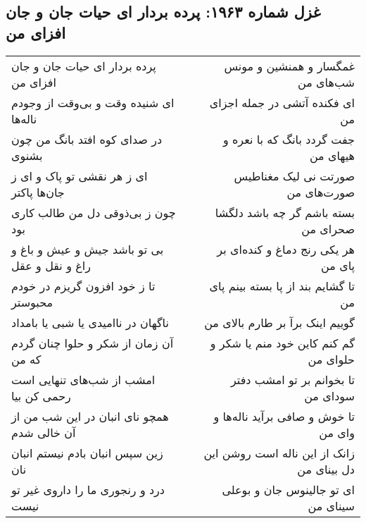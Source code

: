 \begin{center}
\section*{غزل شماره ۱۹۶۳: پرده بردار ای حیات جان و جان افزای من}
\label{sec:1963}
\begin{longtable}{l p{0.5cm} r}
پرده بردار ای حیات جان و جان افزای من
&&
غمگسار و همنشین و مونس شب‌های من
\\
ای شنیده وقت و بی‌وقت از وجودم ناله‌ها
&&
ای فکنده آتشی در جمله اجزای من
\\
در صدای کوه افتد بانگ من چون بشنوی
&&
جفت گردد بانگ که با نعره و هیهای من
\\
ای ز هر نقشی تو پاک و ای ز جان‌ها پاکتر
&&
صورتت نی لیک مغناطیس صورت‌های من
\\
چون ز بی‌ذوقی دل من طالب کاری بود
&&
بسته باشم گر چه باشد دلگشا صحرای من
\\
بی تو باشد جیش و عیش و باغ و راغ و نقل و عقل
&&
هر یکی رنج دماغ و کنده‌ای بر پای من
\\
تا ز خود افزون گریزم در خودم محبوستر
&&
تا گشایم بند از پا بسته بینم پای من
\\
ناگهان در ناامیدی یا شبی یا بامداد
&&
گوییم اینک برآ بر طارم بالای من
\\
آن زمان از شکر و حلوا چنان گردم که من
&&
گم کنم کاین خود منم یا شکر و حلوای من
\\
امشب از شب‌های تنهایی است رحمی کن بیا
&&
تا بخوانم بر تو امشب دفتر سودای من
\\
همچو نای انبان در این شب من از آن خالی شدم
&&
تا خوش و صافی برآید ناله‌ها و وای من
\\
زین سپس انبان بادم نیستم انبان نان
&&
زانک از این ناله است روشن این دل بینای من
\\
درد و رنجوری ما را داروی غیر تو نیست
&&
ای تو جالینوس جان و بوعلی سینای من
\\
\end{longtable}
\end{center}
